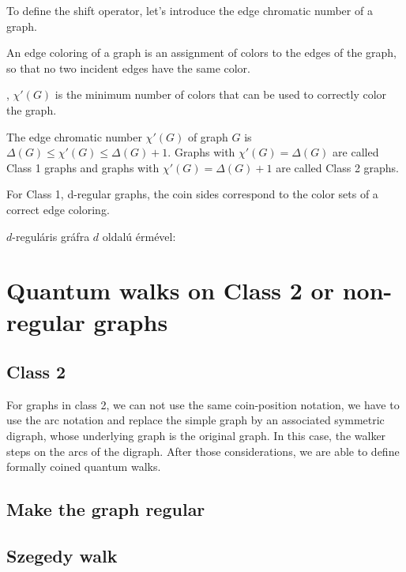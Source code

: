 To define the shift operator, let's introduce the edge chromatic number of a graph.



An edge coloring of a graph is an assignment of colors to the edges of the graph, so that no two incident edges have the same color.

, $\chi'(G)$ is the minimum number of colors that can be used to correctly color the graph.


The edge chromatic number $\chi'(G)$ of graph $G$ is $\Delta(G) \leq{} \chi'(G) \leq{} \Delta(G)+1$. Graphs with $\chi'(G) = \Delta(G)$ are called Class 1 graphs and graphs with $\chi'(G) = \Delta(G)+1$ are called Class 2 graphs.


\theorem{}For Class 1, d-regular graphs, the coin sides correspond to the color sets of a correct edge coloring.

$d$-reguláris gráfra $d$ oldalú érmével:


\section{Quantum walks on Class 2 or non-regular graphs}

\subsection{Class 2}

For graphs in class 2, we can not use the same coin-position notation, we have to use the arc notation and replace the simple graph by an associated symmetric digraph, whose underlying graph is the original graph. In this case, the walker steps on the arcs of the digraph. After those considerations, we are able to define formally coined quantum walks.

\subsection{Make the graph regular}


\subsection{Szegedy walk}

